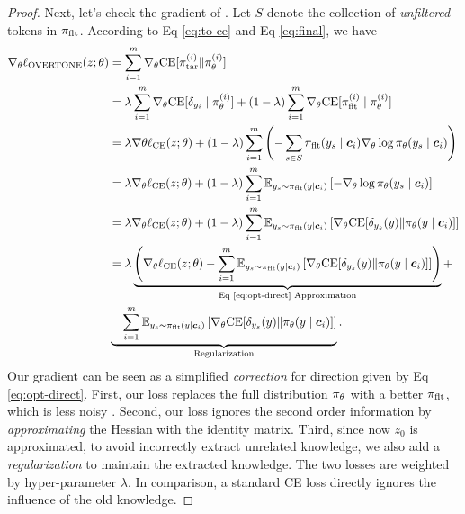 \begin{proof}
Next, let's check the gradient of {\NAME}. 
Let $S$ denote the collection of \textit{unfiltered} tokens in $\pi_\text{flt}$.
According to Eq \eqref{eq:to-ce} and Eq \eqref{eq:final}, we have 
\begin{align*}
\nabla_\theta \ell_{\NAME} (z; \theta) 
&=  
\sum_{i=1}^m \nabla_\theta \ce [\pit^{(i)} \| \pil^{(i)}] \\
&= 
\lambda \sum_{i=1}^m \nabla_\theta \ce [\de{y_i}{} \mid \pil^{(i)}] + (1 - \lambda) \sum_{i=1}^m \nabla_\theta \ce [\pif^{(i)} \mid \pil^{(i)}] \\
&= 
\lambda \nabla\theta \ell_{\ce}(z; \theta) + 
(1-\lambda) \sum_{i=1}^m \left( - \sum_{s\in S} \pif(y_s \mid \cv_i) \nabla_\theta \log \pil (y_s \mid \cv_i) \right) \\
&= 
\lambda \nabla_\theta \ell_{\ce}(z; \theta)
+ 
(1 - \lambda) \sum_{i=1}^m 
\E_{y_s \sim \pif (y \mid \cv_i)} 
\left[ 
- \nabla_\theta \log \pil (y_s \mid \cv_i)
\right] \\
&= 
\lambda \nabla_\theta \ell_{\ce}(z; \theta)
+ 
(1 - \lambda) \sum_{i=1}^m 
\E_{y_s \sim \pif (y \mid \cv_i)} 
\left[ 
\nabla_\theta \ce [ \de{y_s}{y} \| \pil (y \mid \cv_i)]
\right] \\
&= 
\lambda 
\underbrace{\left(
\nabla_\theta \ell_{\ce}(z; \theta)
- \sum_{i=1}^m 
\E_{y_s \sim \pif (y \mid \cv_i)} 
\left[ 
\nabla_\theta \ce [ \de{y_s}{y} \| \pil (y \mid \cv_i)]
\right]
\right)}_{\text{Eq \eqref{eq:opt-direct} Approximation}}
+ \\
& \underbrace{\quad \sum_{i=1}^m 
\E_{y_s \sim \pif (y \mid \cv_i)} 
\left[ 
\nabla_\theta \ce [ \de{y_s}{y} \| \pil (y \mid \cv_i)]
\right]}_{\text{Regularization}}.
\end{align*}
Our gradient can be seen as a simplified \textit{correction} for direction given by Eq \eqref{eq:opt-direct}. 
First, our loss replaces the full distribution $\pi_\theta$ with a better $\pi_\text{flt}$, which is less noisy \citep{}.
Second, our loss ignores the second order information by \textit{approximating} the Hessian with the identity matrix. 
Third, since now $z_0$ is approximated, 
to avoid incorrectly extract unrelated knowledge, we also add a \textit{regularization} to maintain the extracted knowledge.
The two losses are weighted by hyper-parameter $\lambda$. 
In comparison, a standard CE loss directly ignores the influence of the old knowledge. 




\end{proof}
